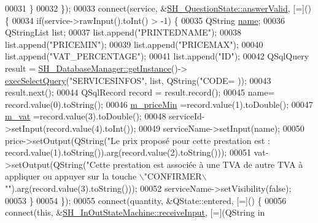 \begin{DoxyCode}
00031         \}
00032     \});
00033     connect(service, &\hyperlink{classSimpleHotel_1_1SH__QuestionState_ad69b23cffd57936805e7b66483c5c951}{SH\_QuestionState::answerValid}, [=]() \{
00034         \textcolor{keywordflow}{if}(service->rawInput().toInt() > -1) \{
00035             QString \hyperlink{classSimpleHotel_1_1SH__NamedObject_ad144716345034c91cface8f3163a799e}{name};
00036             QStringList list;
00037             list.append(\textcolor{stringliteral}{"PRINTEDNAME"});
00038             list.append(\textcolor{stringliteral}{"PRICEMIN"});
00039             list.append(\textcolor{stringliteral}{"PRICEMAX"});
00040             list.append(\textcolor{stringliteral}{"VAT\_PERCENTAGE"});
00041             list.append(\textcolor{stringliteral}{"ID"});
00042             QSqlQuery result = \hyperlink{classSimpleHotel_1_1SH__DatabaseManager_a0bcee98b94b5144e4c066000c4ae3321}{SH\_DatabaseManager::getInstance}()->
      \hyperlink{classSimpleHotel_1_1SH__DatabaseManager_ade052bd4f0e6aa490becef78ce4ea4d7}{execSelectQuery}(\textcolor{stringliteral}{"SERVICESINFOS"}, list, QString(\textcolor{stringliteral}{"CODE=%
      ));
00043             result.next();
00044             QSqlRecord record = result.record();
00045             name= record.value(0).toString();
00046             \hyperlink{classSimpleHotel_1_1SH__ServiceCharging_a72f1c4a2c5ae6344b9e8a8dbd85f1029}{m\_priceMin} =record.value(1).toDouble();
00047             \hyperlink{classSimpleHotel_1_1SH__ServiceCharging_a4cb1fa10bbf8365734f68da006b887af}{m\_vat} =record.value(3).toDouble();
00048             serviceId->setInput(record.value(4).toInt());
00049             serviceName->setInput(name);
00050             price->setOutput(QString(\textcolor{stringliteral}{"Le prix proposé pour cette prestation est : %
      record.value(1).toString()).arg(record.value(2).toString()));
00051             vat->setOutput(QString(\textcolor{stringliteral}{"Cette prestation est associée à une TVA de %
       autre TVA à appliquer ou appuyer sur la touche \(\backslash\)"CONFIRMER\(\backslash\)""}).arg(record.value(3).toString()));
00052             serviceName->setVisibility(\textcolor{keyword}{false});
00053         \}
00054     \});
00055     connect(quantity, &QState::entered, [=]() \{
00056         connect(\textcolor{keyword}{this}, &\hyperlink{classSimpleHotel_1_1SH__InOutStateMachine_a17482446bbf0327e84feb5d6a1a612f0}{SH\_InOutStateMachine::receiveInput}, [=](QString in
}}
\end{DoxyCode}
